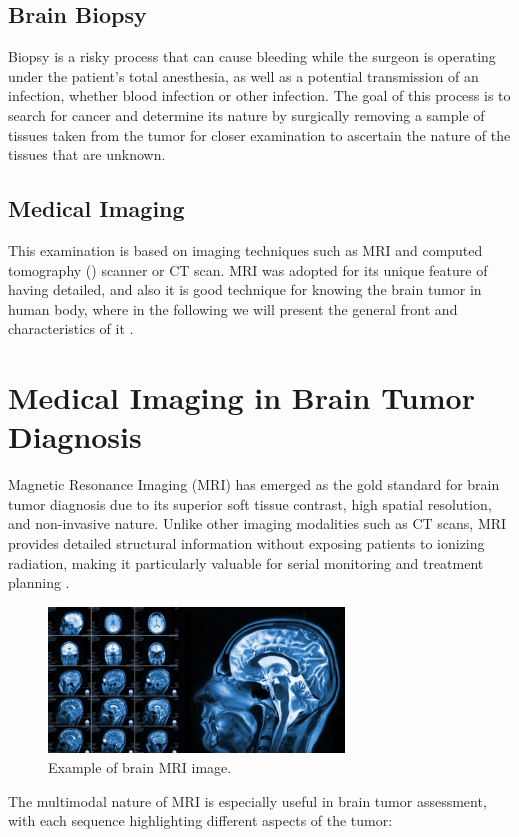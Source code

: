 \subsection{Brain Biopsy}
Biopsy is a risky process that can cause bleeding while the surgeon is operating under the patient's total anesthesia, as well as a potential transmission of an infection, whether blood infection or other infection. The goal of this process is to search for cancer and determine its nature by surgically removing a sample of tissues taken from the tumor for closer examination to ascertain the nature of the tissues that are unknown.

\subsection{Medical Imaging}
This examination is based on imaging techniques such as MRI and computed tomography () scanner or CT scan. MRI was adopted for its unique feature of having detailed, and also it is good technique for knowing the brain tumor in human body, where in the following we will present the general front and characteristics of it \cite{ref10}.


\section{Medical Imaging in Brain Tumor Diagnosis}

Magnetic Resonance Imaging (MRI) has emerged as the gold standard for brain tumor diagnosis due to its superior soft tissue contrast, high spatial resolution, and non-invasive nature. Unlike other imaging modalities such as CT scans, MRI provides detailed structural information without exposing patients to ionizing radiation, making it particularly valuable for serial monitoring and treatment planning \cite{Menze2015}.
\begin{figure}[H]
      \centering
      \includegraphics[width=0.7\textwidth]{Images/Chapter1/mri.png}
      \caption{Example of brain MRI image. \cite{sjra2023brainmri}}
      \label{fig:mri}
\end{figure}
The multimodal nature of MRI is especially useful in brain tumor assessment, with each sequence highlighting different aspects of the tumor:

